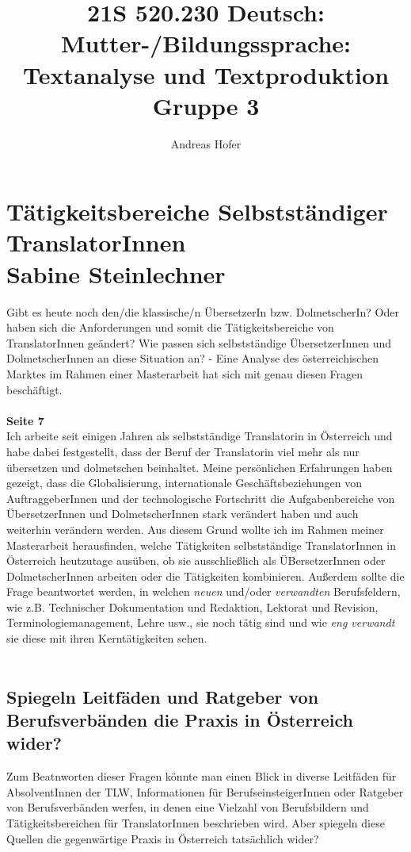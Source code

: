 \documentclass{article}
\title{\vspace{-3cm}21S 520.230 Deutsch: Mutter-/Bildungssprache: Textanalyse und Textproduktion Gruppe 3}
\author{Andreas Hofer}
\begin{document}
	\section*{Tätigkeitsbereiche Selbstständiger TranslatorInnen \\ {\footnotesize Sabine Steinlechner}}
	{\large Gibt es heute noch den/die \glqq klassische/n\grqq \: ÜbersetzerIn bzw. DolmetscherIn? Oder haben sich die Anforderungen und somit die Tätigkeitsbereiche von TranslatorInnen geändert? Wie passen sich selbstständige ÜbersetzerInnen und DolmetscherInnen an diese Situation an? - Eine Analyse des österreichischen Marktes im Rahmen einer Masterarbeit hat sich mit genau diesen Fragen beschäftigt.} \\ \\
	\textbf{Seite 7} \\
	Ich arbeite seit einigen Jahren als selbstständige Translatorin in Österreich und habe dabei festgestellt, dass der Beruf der Translatorin viel mehr als \glqq nur\grqq \: übersetzen und dolmetschen beinhaltet. Meine persönlichen Erfahrungen haben gezeigt, dass die Globalisierung, internationale Geschäftsbeziehungen von AuftraggeberInnen und der technologische Fortschritt die Aufgabenbereiche von ÜbersetzerInnen und DolmetscherInnen stark verändert haben und auch weiterhin verändern werden. Aus diesem Grund wollte ich im Rahmen meiner Masterarbeit herausfinden, welche Tätigkeiten selbstständige TranslatorInnen in Österreich heutzutage ausüben, ob sie ausschließlich als ÜBersetzerInnen oder DolmetscherInnen arbeiten oder die Tätigkeiten kombinieren. Außerdem sollte die Frage beantwortet werden, in welchen \textit{neuen} und/oder \textit{verwandten} Berufsfeldern, wie z.B. Technischer Dokumentation und Redaktion, Lektorat und Revision, Terminologiemanagement, Lehre usw., sie noch tätig sind und wie \textit{eng verwandt} sie diese mit ihren Kerntätigkeiten sehen. \\ \\
	\subsection*{Spiegeln Leitfäden und Ratgeber von Berufsverbänden die Praxis in Österreich wider?}
	Zum Beatnworten dieser Fragen könnte man einen Blick in diverse Leitfäden für AbsolventInnen der TLW, Informationen für BerufseinsteigerInnen oder Ratgeber von Berufsverbänden werfen, in denen eine Vielzahl von Berufsbildern und Tätigkeitsbereichen für TranslatorInnen beschrieben wird. Aber spiegeln diese Quellen die gegenwärtige Praxis in Österreich tatsächlich wider?
\end{document}
